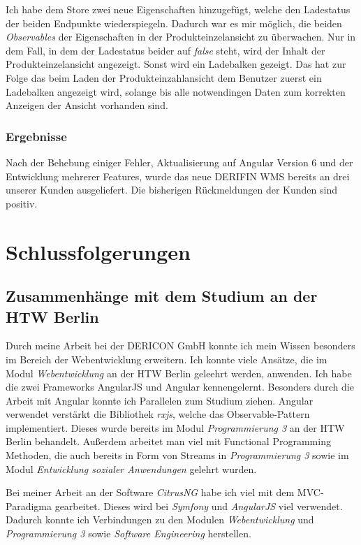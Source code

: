 \documentclass[chapterprefix=false, 12pt, a4paper, oneside, parskip=half, listof=totoc, bibliography=totoc, numbers=noendperiod]{scrbook}
\begin{document}
    Ich habe dem Store zwei neue Eigenschaften hinzugefügt, welche den Ladestatus der beiden Endpunkte wiederspiegeln.
    Dadurch war es mir möglich, die beiden \textit{Observables} der Eigenschaften in der Produkteinzelansicht zu überwachen.
    Nur in dem Fall, in dem der Ladestatus beider auf \textit{false} steht, wird der Inhalt der Produkteinzelansicht angezeigt.
    Sonst wird ein Ladebalken gezeigt. Das hat zur Folge das beim Laden der Produkteinzahlansicht dem Benutzer zuerst ein Ladebalken
    angezeigt wird, solange bis alle notwendingen Daten zum korrekten Anzeigen der Ansicht vorhanden sind.


    \subsection{Ergebnisse}

    Nach der Behebung einiger Fehler, Aktualisierung auf Angular Version 6 und der Entwicklung mehrerer Features,
    wurde das neue DERIFIN WMS bereits an drei unserer Kunden ausgeliefert. Die bisherigen Rückmeldungen der Kunden sind positiv.

    \chapter{Schlussfolgerungen}

    \section{Zusammenhänge mit dem Studium an der HTW Berlin}

    Durch meine Arbeit bei der DERICON GmbH konnte ich mein Wissen besonders im Bereich der Webentwicklung erweitern.
    Ich konnte viele Ansätze, die im Modul \textit{Webentwicklung} an der HTW  Berlin geleehrt werden, anwenden. Ich habe die zwei Frameworks
    AngularJS und Angular kennengelernt. Besonders durch die Arbeit mit Angular konnte ich Parallelen zum Studium ziehen. Angular
    verwendet verstärkt die Bibliothek \textit{rxjs}, welche das Observable-Pattern implementiert. Dieses wurde bereits im Modul
    \textit{Programmierung 3} an der HTW Berlin behandelt. Außerdem arbeitet man viel mit Functional Programming Methoden, die auch bereits in Form
    von Streams in \textit{Programmierung 3} sowie im Modul \textit{Entwicklung sozialer Anwendungen} gelehrt wurden.

    Bei meiner Arbeit an der Software \textit{CitrusNG} habe ich viel mit dem MVC-Paradigma gearbeitet. Dieses wird bei \textit{Symfony}
    und \textit{AngularJS} viel verwendet. Dadurch konnte ich Verbindungen zu den Modulen \textit{Webentwicklung} und \textit{Programmierung 3}
    sowie \textit{Software Engineering} herstellen.




\end{document}
